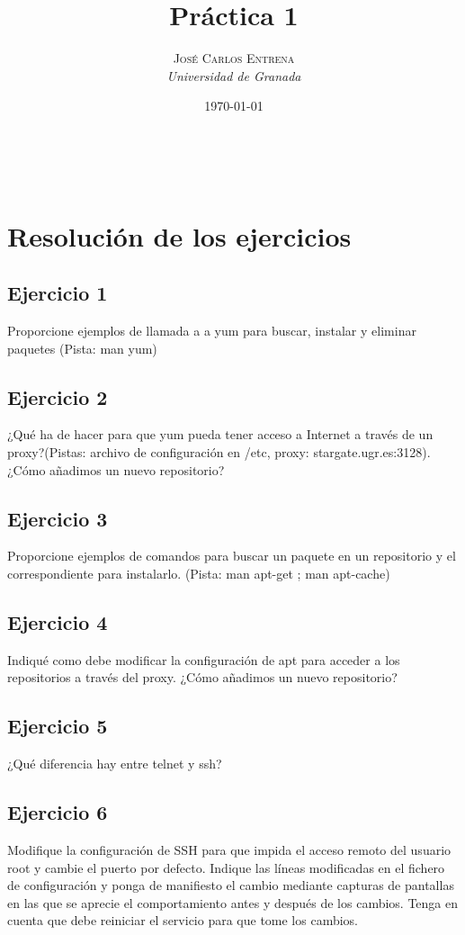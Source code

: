 \documentclass[a4paper, 11pt]{article} %
\title{\textbf{Práctica 1}\\ %
} %
\author{\textsc{José Carlos Entrena} %
\\{\textit{Universidad de Granada}}} %
\date{\today} %
\makeatletter
\renewcommand{\maketitle}{ %
\begin{flushright} %
{\LARGE\@title} %

\vspace{60pt} %

{\large\@author} %
\\\@date %

\vspace{40pt} %
\end{flushright}
}
\makeatother
\begin{document}
\maketitle %

{\parskip=2pt
  \tableofcontents
}   %

\pagebreak %

\section{Resolución de los ejercicios}

\subsection{Ejercicio 1}
Proporcione ejemplos de llamada a a yum para buscar, instalar y eliminar
paquetes (Pista: man yum)


\subsection{Ejercicio 2}
¿Qué ha de hacer para que yum pueda tener acceso a Internet a través
de un proxy?(Pistas: archivo de configuración en /etc, proxy: stargate.ugr.es:3128).
¿Cómo añadimos un nuevo repositorio?


\subsection{Ejercicio 3}
Proporcione ejemplos de comandos para buscar un paquete en un
repositorio y el correspondiente para instalarlo. (Pista: man apt-get ; man apt-cache)


\subsection{Ejercicio 4}
Indiqué como debe modificar la configuración de apt para acceder a los
repositorios a través del proxy. ¿Cómo añadimos un nuevo repositorio?


\subsection{Ejercicio 5}
¿Qué diferencia hay entre telnet y ssh?


\subsection{Ejercicio 6}
Modifique la configuración de SSH para que impida el acceso remoto del
usuario root y cambie el puerto por defecto. Indique las líneas modificadas en el
fichero de configuración y ponga de manifiesto el cambio mediante capturas de
pantallas en las que se aprecie el comportamiento antes y después de los cambios.
Tenga en cuenta que debe reiniciar el servicio para que tome los cambios.
\end{document}
